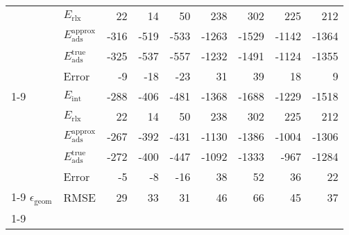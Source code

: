 \begin{longtable}{llrrrrrrr}
 & $E_\textrm{rlx}$ & 22 & 14 & 50 & 238 & 302 & 225 & 212 \\
 & $E_\textrm{ads}^\textrm{approx}$ & -316 & -519 & -533 & -1263 & -1529 & -1142 & -1364 \\
 & $E_\textrm{ads}^\textrm{true}$ & -325 & -537 & -557 & -1232 & -1491 & -1124 & -1355 \\
 & Error & -9 & -18 & -23 & 31 & 39 & 18 & 9 \\
\cline{1-9}
\multirow[]{5}{*}{\rotatebox{90}{HSE06-D4}} & $E_\textrm{int}$ & -288 & -406 & -481 & -1368 & -1688 & -1229 & -1518 \\
 & $E_\textrm{rlx}$ & 22 & 14 & 50 & 238 & 302 & 225 & 212 \\
 & $E_\textrm{ads}^\textrm{approx}$ & -267 & -392 & -431 & -1130 & -1386 & -1004 & -1306 \\
 & $E_\textrm{ads}^\textrm{true}$ & -272 & -400 & -447 & -1092 & -1333 & -967 & -1284 \\
 & Error & -5 & -8 & -16 & 38 & 52 & 36 & 22 \\
\cline{1-9}
$\epsilon_\textrm{geom}$ & RMSE & 29 & 33 & 31 & 46 & 66 & 45 & 37 \\
\cline{1-9}
\end{longtable}